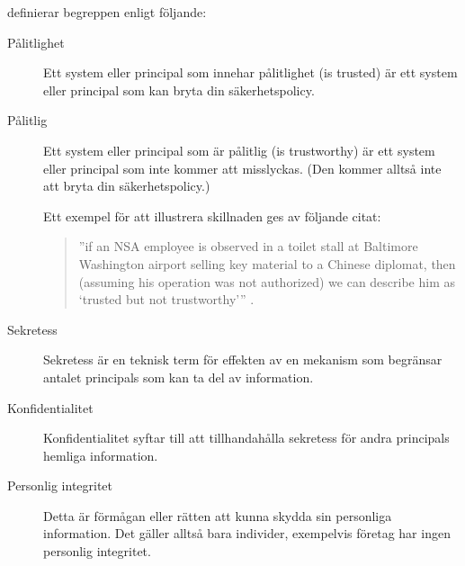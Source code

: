 \documentclass[a4paper,addpoints]{miunexam}
\begin{document}
\begin{questions}

  \begin{solution}
    \citet[ss.\ 13--14]{Anderson2008sea} definierar begreppen enligt följande:
    \begin{description}
      \item[Pålitlighet] Ett system eller principal som innehar pålitlighet 
        (\foreignlanguage{english}{is trusted}) är ett system eller principal 
        som kan bryta din säkerhetspolicy.

      \item[Pålitlig] Ett system eller principal som är pålitlig 
        (\foreignlanguage{english}{is trustworthy}) är ett system eller 
        principal som inte kommer att misslyckas.
        (Den kommer alltså inte att bryta din säkerhetspolicy.)

        Ett exempel för att illustrera skillnaden ges av följande citat: 
        \begin{quote}
          \foreignlanguage{english}{
          ''if an NSA employee is observed in a toilet stall at Baltimore 
          Washington airport selling key material to a Chinese diplomat, then 
          (assuming his operation was not authorized) we can describe him as 
          `trusted but not trustworthy''' \cite[s.\  13]{Anderson2008sea}.
          }
        \end{quote}

      \item[Sekretess] Sekretess är en teknisk term för effekten av en mekanism 
        som begränsar antalet principals som kan ta del av information.

      \item[Konfidentialitet] Konfidentialitet syftar till att tillhandahålla 
        sekretess för andra principals hemliga information.

      \item[Personlig integritet] Detta är förmågan eller rätten att kunna 
        skydda sin personliga information.
        Det gäller alltså bara individer, exempelvis företag har ingen 
        personlig integritet.


\end{description}
\end{solution}
\end{questions}
\end{document}
